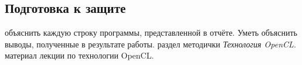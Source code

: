 { %
	\subsection{Подготовка к защите}
	\begin{enumerate}
		 объяснить каждую строку программы, представленной в отчёте. Уметь объяснить выводы, полученные в результате работы.
		 раздел методички %
 \textit{Технология OpenCL}.
		 материал лекции по технологии OpenCL.
	\end{enumerate}
}
